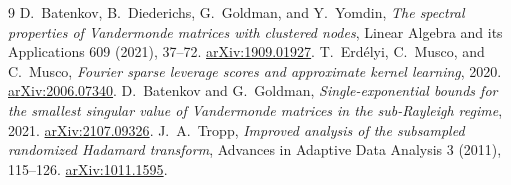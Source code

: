 \documentclass[11pt]{article}
\theoremstyle{remark}\newtheorem{remark}[theorem]{Remark}
\begin{document}
\begin{thebibliography}{9}
 D.~Batenkov, B.~Diederichs, G.~Goldman, and Y.~Yomdin,
\emph{The spectral properties of Vandermonde matrices with clustered nodes},
Linear Algebra and its Applications 609 (2021), 37--72.
\href{https://arxiv.org/abs/1909.01927}{arXiv:1909.01927}.
 T.~Erd\'elyi, C.~Musco, and C.~Musco,
\emph{Fourier sparse leverage scores and approximate kernel learning},
2020. \href{https://arxiv.org/abs/2006.07340}{arXiv:2006.07340}.
 D.~Batenkov and G.~Goldman,
\emph{Single-exponential bounds for the smallest singular value of
Vandermonde matrices in the sub-Rayleigh regime}, 2021.
\href{https://arxiv.org/abs/2107.09326}{arXiv:2107.09326}.
 J.~A.~Tropp,
\emph{Improved analysis of the subsampled randomized Hadamard transform},
Advances in Adaptive Data Analysis 3 (2011), 115--126.
\href{https://arxiv.org/abs/1011.1595}{arXiv:1011.1595}.
\end{thebibliography}
\end{document}
